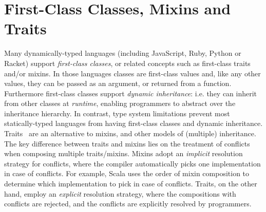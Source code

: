 

\section{First-Class Classes, Mixins and Traits}

Many dynamically-typed languages (including JavaScript, Ruby, Python or Racket)
support \emph{first-class classes}, or related concepts such as first-class
traits and/or mixins. In those languages classes are first-class values and,
like any other values, they can be passed as an argument, or returned from a
function. Furthermore first-class classes support \emph{dynamic inheritance}:
i.e. they can inherit from other classes at \emph{runtime}, enabling programmers
to abstract over the inheritance hierarchy. In contrast, type system limitations
prevent most statically-typed languages from having first-class classes and
dynamic inheritance. Traits~\citep{scharli2003traits, Ducasse_2006} are an alternative to
mixins, and other models of (multiple) inheritance. The key difference between
traits and mixins lies on the treatment of conflicts when composing multiple
traits/mixins. Mixins adopt an \emph{implicit} resolution strategy for
conflicts, where the compiler automatically picks one implementation in case of
conflicts. For example, Scala uses the order of mixin composition to determine
which implementation to pick in case of conflicts. Traits, on the other hand,
employ an \emph{explicit} resolution strategy, where the compositions with
conflicts are rejected, and the conflicts are explicitly resolved by
programmers.

